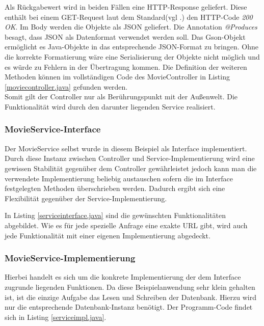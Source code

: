 \documentclass[fleqn,10.5pt,ngerman]{SelfArx}
\begin{document}
Als Rückgabewert wird in beiden Fällen eine HTTP-Response geliefert. Diese enthält bei einem GET-Request laut dem Standard(vgl .\cite{httpcodes}) den HTTP-Code \textit{200 OK}. Im Body werden die Objekte als JSON geliefert. Die Annotation \textit{@Produces} besagt, dass JSON als Datenformat verwendet werden soll. Das Gson-Objekt ermöglicht es Java-Objekte in das entsprechende JSON-Format zu bringen. Ohne die korrekte Formatierung wäre eine Serialisierung der Objekte nicht möglich und es würde zu Fehlern in der Übertragung kommen. Die Definition der weiteren Methoden können im vollständigen Code des MovieController in Listing \ref{moviecontroller.java} gefunden werden. \\ Somit gilt der Controller nur als Berührungspunkt mit der Außenwelt. Die Funktionalität wird durch den darunter liegenden Service realisiert.
\subsubsection{MovieService-Interface}
Der MovieService selbst wurde in diesem Beispiel als Interface implementiert. Durch diese Instanz zwischen Controller und Service-Implementierung wird eine gewissen Stabilität gegenüber dem Controller gewährleistet jedoch kann man die verwendete Implementierung beliebig austauschen sofern die im Interface festgelegten Methoden überschrieben werden. Dadurch ergibt sich eine Flexibilität gegenüber der Service-Implementierung. 

In Listing \ref{serviceinterface.java} sind die gewünschten Funktionalitäten abgebildet. Wie es für jede spezielle Anfrage eine exakte URL gibt, wird auch jede Funktionalität mit einer eigenen Implementierung abgedeckt.
\subsubsection{MovieService-Implementierung}
Hierbei handelt es sich um die konkrete Implementierung der dem Interface zugrunde liegenden Funktionen. Da diese Beispielanwendung sehr klein gehalten ist, ist die einzige Aufgabe das Lesen und Schreiben der Datenbank. Hierzu wird nur die entsprechende Datenbank-Instanz benötigt. Der Programm-Code findet sich in Listing \ref{serviceimpl.java}.
\end{document}

